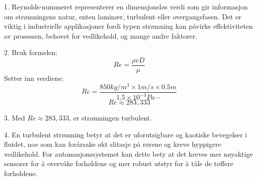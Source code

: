 1. Reynolds-nummeret representerer en dimensjonsløs verdi som gir informasjon om strømningens natur, enten laminær, turbulent eller overgangsfasen. Det er viktig i industrielle applikasjoner fordi typen strømning kan påvirke effektiviteten av prosessen, behovet for vedlikehold, og mange andre faktorer.

2. Bruk formelen:
\[ Re = \frac{\rho v D}{\mu} \]
Setter inn verdiene:
\[ Re = \frac{850 kg/m^3 \times 1 m/s \times 0.5 m}{1.5 \times 10^{-3}  Pa\cdots} \]
\[ Re \approx 283,333 \]

3. Med \(Re \approx 283,333\), er strømningen turbulent.

4. En turbulent strømning betyr at det er uforutsigbare og kaotiske bevegelser i fluidet, noe som kan forårsake økt slitasje på rørene og kreve hyppigere vedlikehold. For automasjonssystemet kan dette bety at det kreves mer nøyaktige sensorer for å overvåke forholdene og mer robust utstyr for å tåle de tøffere forholdene.







